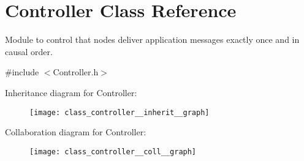 \hypertarget{class_controller}{}\section{Controller Class Reference}
\label{class_controller}


Module to control that nodes deliver application messages exactly once and in causal order.  




{\ttfamily \#include $<$Controller.\+h$>$}



Inheritance diagram for Controller\+:
\nopagebreak
\begin{figure}[H]
\begin{center}
\leavevmode
\texttt{[image: class\_controller\_\_inherit\_\_graph]}
\end{center}
\end{figure}


Collaboration diagram for Controller\+:
\nopagebreak
\begin{figure}[H]
\begin{center}
\leavevmode
\texttt{[image: class\_controller\_\_coll\_\_graph]}
\end{center}
\end{figure}
